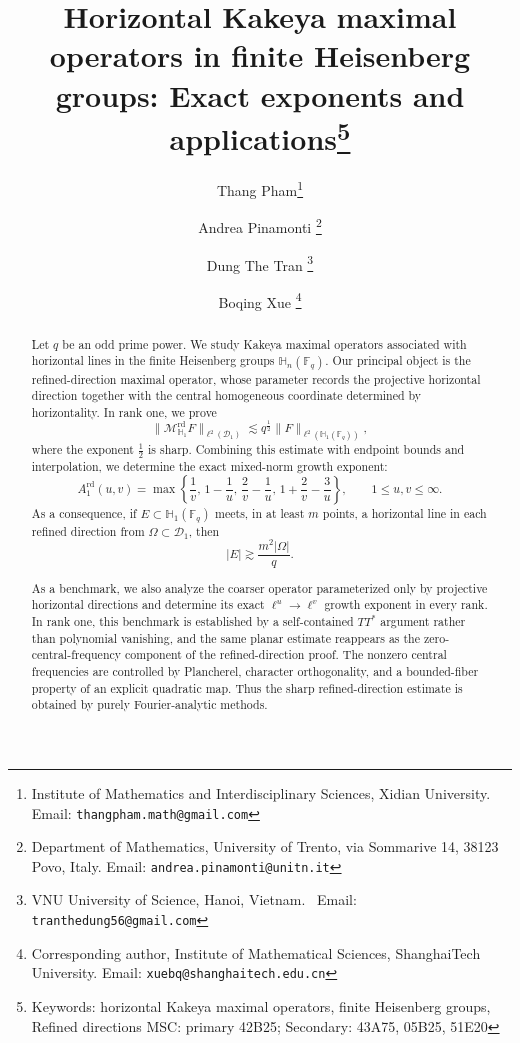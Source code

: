 \documentclass[11pt]{article}
\newcommand{\1}{\mathbf 1}
\begin{document}
\title{Horizontal Kakeya maximal operators in finite Heisenberg groups: Exact exponents and applications\thanks{Keywords: horizontal Kakeya maximal operators, finite Heisenberg groups, Refined directions\newline
\hspace*{0.45cm} MSC: primary 42B25; Secondary: 43A75, 05B25, 51E20}}
\author{Thang Pham\thanks{Institute of Mathematics and Interdisciplinary Sciences, Xidian University. \newline
\hspace*{0.45cm} Email: {\tt thangpham.math@gmail.com}} \and Andrea Pinamonti \thanks{Department of Mathematics, University of Trento, via Sommarive 14, 38123 Povo, Italy. \newline
\hspace*{0.45cm} Email: {\tt andrea.pinamonti@unitn.it}}\and Dung The Tran \thanks{VNU University of Science, Hanoi, Vietnam. ~Email: {\tt tranthedung56@gmail.com}}\and Boqing Xue \thanks{Corresponding author, Institute of Mathematical Sciences, ShanghaiTech University. \newline
\hspace*{0.45cm} Email: {\tt xuebq@shanghaitech.edu.cn}}}
\date{}
\maketitle


{  \begin{abstract}
Let \(q\) be an odd prime power. We study Kakeya maximal operators associated with horizontal lines in the finite Heisenberg groups \(\mathbb H_n(\mathbb F_q)\). Our principal object is the refined-direction maximal operator, whose parameter records the projective horizontal direction together with the central homogeneous coordinate determined by horizontality. In rank one, we prove
\[
\|\mathcal M_{\mathbb H_1}^{\mathrm{rd}}F\|_{\ell^2(\mathcal D_1)}
\lesssim q^{\frac{1}{2}}
\|F\|_{\ell^2(\mathbb H_1(\mathbb F_q))},
\]
where the exponent \(\frac{1}{2}\) is sharp. Combining this estimate with endpoint bounds and interpolation, we determine the exact mixed-norm growth exponent:
\[
A^{\mathrm{rd}}_1(u,v)
=
\max\left\{
\frac1v,\,
1-\frac1u,\,
\frac2v-\frac1u,\,
1+\frac2v-\frac3u
\right\},
\qquad 1\le u,v\le\infty.
\]
As a consequence, if \(E\subset\mathbb H_1(\mathbb F_q)\) meets, in at least \(m\) points, a horizontal line in each refined direction from
\(\Omega\subset\mathcal D_1\), then
\[
|E|\gtrsim \frac{m^2|\Omega|}{q}.
\]

As a benchmark, we also analyze the coarser operator parameterized only by projective horizontal directions and determine its exact \(\ell^u\to\ell^v\) growth exponent in every rank. In rank one, this benchmark is established by a self-contained \(TT^*\) argument rather than polynomial vanishing, and the same planar estimate reappears as the zero-central-frequency component of the refined-direction proof. The nonzero central frequencies are controlled by Plancherel, character orthogonality, and a bounded-fiber property of an explicit quadratic map. Thus the sharp refined-direction estimate is obtained by purely Fourier-analytic methods.
\end{abstract}}
\end{document}
